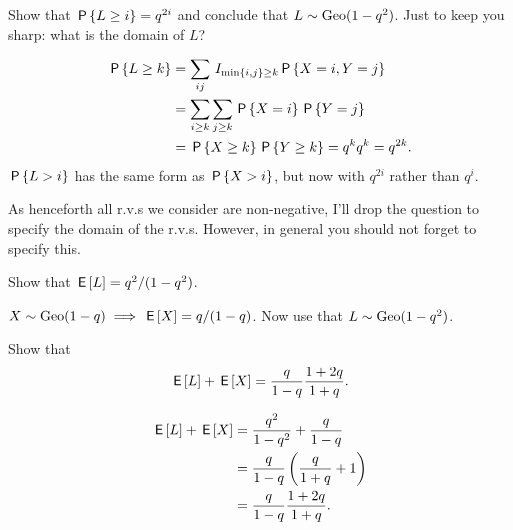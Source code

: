 \documentclass[a4paper,12pt]{article}
\begin{document}
\begin{exercise}
Show that $\P{L\geq i}=q^{2i}$ and conclude that $L\sim\Geo{1-q^{2}}$. Just to keep you sharp: what is the domain of $L$?
\begin{solution}
  \begin{align}
    \label{eq:12}
\P{L\geq k} 
&= \sum_{ij} \1{\min{i,j}\geq k} \P{X=i, Y=j}\\
&= \sum_{i\geq k} \sum_{j\geq k} \P{X=i}\P{Y=j}\\
&=  \P{X\geq k}\P{Y\geq k} = q^{k} q^{k} = q^{2k}.
  \end{align}
$\P{L>i}$ has the same form as $\P{X>i}$, but now with $q^{2i}$ rather than $q^{i}$.
\end{solution}
\end{exercise}

As henceforth all r.v.s we consider are non-negative, I'll drop the question to specify the domain of the r.v.s. However, in general you should not forget to specify this. 



\begin{exercise}\label{ex:3}
Show that  $\E L=q^{2}/(1-q^{2})$.
\begin{solution}
$X\sim \Geo{1-q} \implies \E X = q/(1-q)$. Now use that $L\sim\Geo{1-q^{2}}$. 
\end{solution}
\end{exercise}

\begin{exercise}
Show that 
\begin{equation}
  \label{eq:39}
\E L + \E X = \frac q{1-q}\frac{1+2q}{1+q}.
\end{equation}
\begin{solution}
  \begin{align}
    \label{eq:2}
\E L     + \E X 
&= \frac{q^{2}}{1-q^2} + \frac{q}{1-q} \\
&= \frac q{1-q}\left(\frac{q}{1+q} + 1\right)\\
&= \frac q{1-q}\frac{1+2q}{1+q}.
  \end{align}
\end{solution}
\end{exercise}
\end{document}
